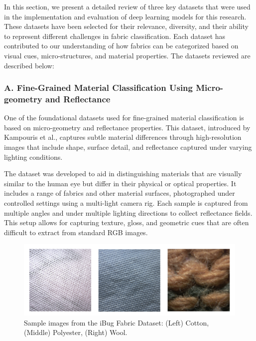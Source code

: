 In this section, we present a detailed review of three key datasets that were used in the implementation and evaluation of deep learning models for this research. These datasets have been selected for their relevance, diversity, and their ability to represent different challenges in fabric classification. Each dataset has contributed to our understanding of how fabrics can be categorized based on visual cues, micro-structures, and material properties. The datasets reviewed are described below:

\newpage
\subsubsection{A. Fine-Grained Material Classification Using Micro-geometry and Reflectance~\cite{kampouris2016fine}}

One of the foundational datasets used for fine-grained material classification is based on micro-geometry and reflectance properties. This dataset, introduced by Kampouris et al., captures subtle material differences through high-resolution images that include shape, surface detail, and reflectance captured under varying lighting conditions.

The dataset was developed to aid in distinguishing materials that are visually similar to the human eye but differ in their physical or optical properties. It includes a range of fabrics and other material surfaces, photographed under controlled settings using a multi-light camera rig. Each sample is captured from multiple angles and under multiple lighting directions to collect reflectance fields. This setup allows for capturing texture, gloss, and geometric cues that are often difficult to extract from standard RGB images.

\begin{figure}[H]
    \centering
    \begin{minipage}{0.8\linewidth}
        \includegraphics[width=\linewidth]{images/iBugDataset}
    \end{minipage}
    \caption[Sample images from the iBug Fabric Dataset]{Sample images from the iBug Fabric Dataset: (Left) Cotton, (Middle) Polyester, (Right) Wool.}
\end{figure}

